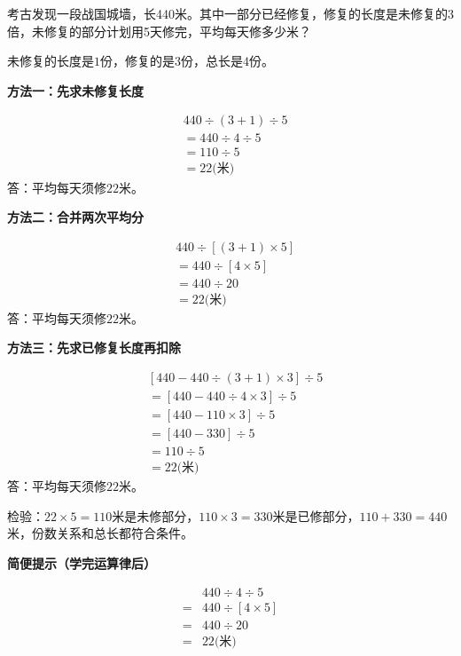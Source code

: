 考古发现一段战国城墙，长440米。其中一部分已经修复，修复的长度是未修复的3倍，未修复的部分计划用5天修完，平均每天修多少米？\par
\begin{BookAnswer}
未修复的长度是\(1\)份，修复的是\(3\)份，总长是\(4\)份。\par \par\noindent\begin{minipage}{\linewidth}\textbf{方法一：先求未修复长度}\par \[\begin{aligned}&440\div(3+1)\div5\\&=440\div4\div5\\&=110\div5\\&=22\text{(米)}\end{aligned}\]答：平均每天须修\(22\)米。\end{minipage}\par \par \par\noindent\begin{minipage}{\linewidth}\textbf{方法二：合并两次平均分}\par \[\begin{aligned}&440\div[(3+1)\times5]\\&=440\div[4\times5]\\&=440\div20\\&=22\text{(米)}\end{aligned}\]答：平均每天须修\(22\)米。\end{minipage}\par \par \par\noindent\begin{minipage}{\linewidth}\textbf{方法三：先求已修复长度再扣除}\par \[\begin{aligned}&[440-440\div(3+1)\times3]\div5\\&=[440-440\div4\times3]\div5\\&=[440-110\times3]\div5\\&=[440-330]\div5\\&=110\div5\\&=22\text{(米)}\end{aligned}\]答：平均每天须修\(22\)米。\end{minipage}\par \par 检验：\(22\times5=110\)米是未修部分，\allowbreak{}\(110\times3=330\)米是已修部分，\allowbreak{}\(110+330=440\)米，份数关系和总长都符合条件。\par\textbf{简便提示（学完运算律后）}\par \[\begin{aligned}&440\div4\div5\\={}&440\div[4\times5]\\={}&440\div20\\={}&22\text{(米)}\end{aligned}\]
\end{BookAnswer}

